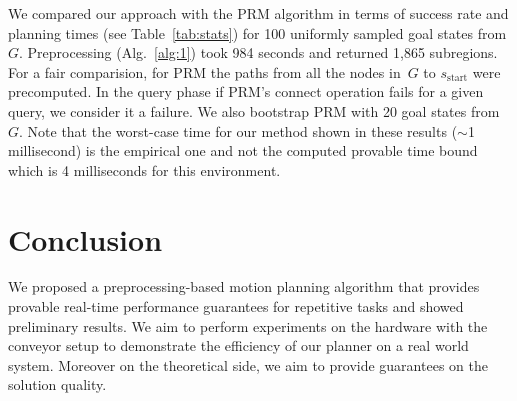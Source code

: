 \documentclass[letterpaper]{article} %
\newcommand{\calS}{\ensuremath{\mathcal{S}}\xspace}
\begin{document}
We compared our approach with the \textsf{PRM} algorithm in terms of success rate and planning times (see Table~\ref{tab:stats}) for 100 uniformly sampled goal states from $G$. 
Preprocessing (Alg.~\ref{alg:1}) took 984 seconds and returned 1,865 subregions. For a fair comparision, for \textsf{PRM} the paths from all the nodes in~$G$ to $s_{\text{start}}$ were precomputed. 
In the query phase if \textsf{PRM}'s connect operation fails for a given query, we consider it a failure. 
We also bootstrap \textsf{PRM} with 20 goal states from~$G$. Note that the worst-case time for our method shown in these results ($\sim$1 millisecond) is the empirical one and not the computed provable time bound which is 4 milliseconds for this environment.

 \section{Conclusion}
We proposed a preprocessing-based motion planning algorithm that provides provable real-time performance guarantees for repetitive tasks and showed preliminary results. We aim to perform experiments on the hardware with the conveyor setup to demonstrate the efficiency of our planner on a real world system. Moreover on the theoretical side, we aim to provide guarantees on the solution quality.




%



\end{document}
